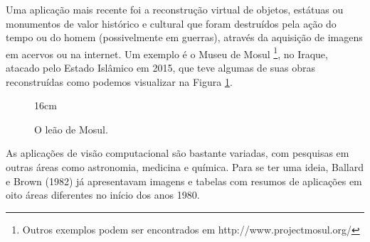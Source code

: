 Uma aplicação mais recente foi a reconstrução virtual de objetos, estátuas ou monumentos de valor histórico e cultural que foram destruídos pela ação do tempo ou do homem (possivelmente em guerras), através da aquisição de imagens em acervos ou na internet. Um exemplo é o Museu de Mosul {\footnote{Outros exemplos podem ser encontrados em http://www.projectmosul.org/}}, no Iraque, atacado pelo 
Estado Islâmico em 2015, que teve algumas de suas obras reconstruídas como podemos visualizar na Figura \ref{fig.mossul}.


\begin{figure}[!htb]{16cm}
\caption{O le\~ao de Mosul.}
\hfill
\quad
{}\hfill
{}
\label{fig.mossul}
\end{figure}

As aplicações de visão computacional são bastante variadas, com pesquisas em outras áreas como astronomia, medicina e química. Para se ter uma ideia, Ballard e Brown (1982) já apresentavam imagens e tabelas com resumos de aplicações em oito áreas diferentes no início dos anos 1980.  

